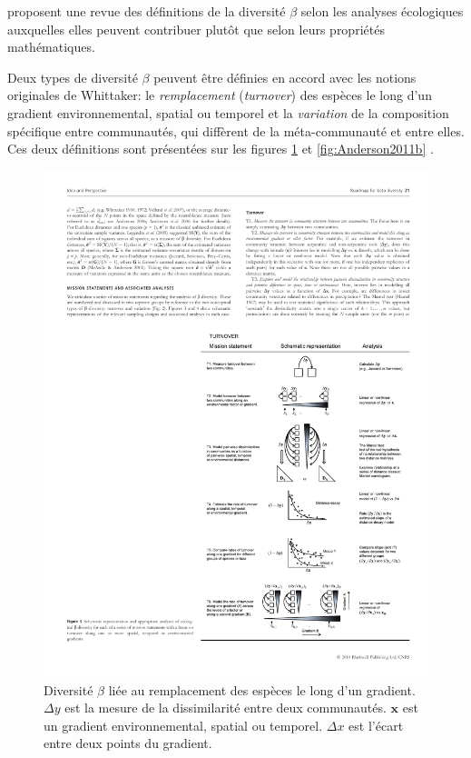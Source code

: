 \documentclass[
  11pt,
  french,
  a4paper,
  extrafontsizes,onecolumn,openright
  ]{memoir}
\begin{document}
\textcite{Anderson2011} proposent une revue des définitions de la diversité \(\beta\) selon les analyses écologiques auxquelles elles peuvent contribuer plutôt que selon leurs propriétés mathématiques.

Deux types de diversité \(\beta\) peuvent être définies \autocite{Vellend2001} en accord avec les notions originales de Whittaker: le \emph{remplacement} (\emph{turnover}) des espèces le long d'un gradient environnemental, spatial ou temporel et la \emph{variation} de la composition spécifique entre communautés, qui diffèrent de la méta-communauté et entre elles.
Ces deux définitions sont présentées sur les figures \ref{fig:Anderson2011a} et \ref{fig:Anderson2011b} \autocite{Anderson2011}.



\scriptsize

\begin{figure}

{\centering \includegraphics[width=0.8\linewidth]{images/Anderson2011a} 

}

\caption{Diversité \(\beta\) liée au remplacement des espèces le long d'un gradient. \(\Delta{y}\) est la mesure de la dissimilarité entre deux communautés. \(\mathbf{x}\) est un gradient environnemental, spatial ou temporel. \(\Delta{x}\) est l'écart entre deux points du gradient.}\label{fig:Anderson2011a}
\end{figure}
\end{document}
